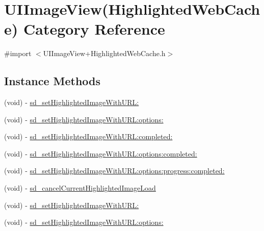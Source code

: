 \hypertarget{category_u_i_image_view_07_highlighted_web_cache_08}{}\section{U\+I\+Image\+View(Highlighted\+Web\+Cache) Category Reference}
\label{category_u_i_image_view_07_highlighted_web_cache_08}


{\ttfamily \#import $<$U\+I\+Image\+View+\+Highlighted\+Web\+Cache.\+h$>$}

\subsection*{Instance Methods}
\begin{DoxyCompactItemize}
\item 
(void) -\/ \mbox{\hyperlink{category_u_i_image_view_07_highlighted_web_cache_08_aead947977bf9f935d00079ce090a394d}{sd\+\_\+set\+Highlighted\+Image\+With\+U\+R\+L\+:}}
\item 
(void) -\/ \mbox{\hyperlink{category_u_i_image_view_07_highlighted_web_cache_08_a6280a94232644970a918aa0c0eebb008}{sd\+\_\+set\+Highlighted\+Image\+With\+U\+R\+L\+:options\+:}}
\item 
(void) -\/ \mbox{\hyperlink{category_u_i_image_view_07_highlighted_web_cache_08_a25316746c184695632dd8f4b36fd219c}{sd\+\_\+set\+Highlighted\+Image\+With\+U\+R\+L\+:completed\+:}}
\item 
(void) -\/ \mbox{\hyperlink{category_u_i_image_view_07_highlighted_web_cache_08_a3bbfcd1433513161520293acac8f9fff}{sd\+\_\+set\+Highlighted\+Image\+With\+U\+R\+L\+:options\+:completed\+:}}
\item 
(void) -\/ \mbox{\hyperlink{category_u_i_image_view_07_highlighted_web_cache_08_a06bdae01c3cfc17896de4b8d3c33702d}{sd\+\_\+set\+Highlighted\+Image\+With\+U\+R\+L\+:options\+:progress\+:completed\+:}}
\item 
(void) -\/ \mbox{\hyperlink{category_u_i_image_view_07_highlighted_web_cache_08_aa7a59df2fc670e4fe5e4e7928e8e4485}{sd\+\_\+cancel\+Current\+Highlighted\+Image\+Load}}
\item 
(void) -\/ \mbox{\hyperlink{category_u_i_image_view_07_highlighted_web_cache_08_aead947977bf9f935d00079ce090a394d}{sd\+\_\+set\+Highlighted\+Image\+With\+U\+R\+L\+:}}
\item 
(void) -\/ \mbox{\hyperlink{category_u_i_image_view_07_highlighted_web_cache_08_a6280a94232644970a918aa0c0eebb008}{sd\+\_\+set\+Highlighted\+Image\+With\+U\+R\+L\+:options\+:}}

\end{DoxyCompactItemize}
